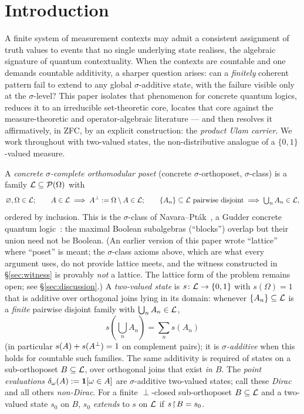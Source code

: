 \section{Introduction}

A finite system of measurement contexts may admit a consistent assignment of
truth values to events that no single underlying state realises, the
algebraic signature of quantum contextuality. When the contexts are countable
and one demands countable additivity, a sharper question arises: can a
\emph{finitely} coherent pattern fail to extend to any global $\sigma$-additive
state, with the failure visible only at the $\sigma$-level? This paper isolates
that phenomenon for concrete quantum logics, reduces it to an irreducible
set-theoretic core, locates that core against the measure-theoretic and
operator-algebraic literature --- and then resolves it affirmatively, in ZFC,
by an explicit construction: the \emph{product Ulam carrier}. We work throughout
with two-valued states, the non-distributive analogue of a $\{0,1\}$-valued measure.

A \emph{concrete $\sigma$-complete orthomodular poset} (concrete $\sigma$-orthoposet,
$\sigma$-class)
is a family $\mathcal{L} \subseteq \mathcal{P}(\Omega)$ with
\[
  \varnothing, \Omega \in \mathcal{L}; \qquad
  A \in \mathcal{L} \implies A{}^{\perp} := \Omega\setminus A \in \mathcal{L}; \qquad
  \{A_n\}\subseteq\mathcal{L} \text{ pairwise disjoint} \implies \textstyle\bigcup_n A_n \in \mathcal{L},
\]
ordered by inclusion. This is the $\sigma$-class of Navara--Pt\'ak~\cite{NavaraPtak1983},
a Gudder concrete quantum logic~\cite{Gudder1969,PtakPulmannova1991}: the maximal
Boolean subalgebras (``blocks'') overlap but their union need not be Boolean.
(An earlier version of this paper wrote ``lattice'' where ``poset'' is meant; the
$\sigma$-class axioms above, which are what every argument uses, do not provide
lattice meets, and the witness constructed in \S\ref{sec:witness} is provably
\emph{not} a lattice. The lattice form of the problem remains open;
see \S\ref{sec:discussion}.) A
\emph{two-valued state} is $s\colon\mathcal{L}\to\{0,1\}$ with $s(\Omega)=1$ that is
additive over orthogonal joins lying in its domain: whenever $\{A_n\}\subseteq\mathcal{L}$
is a \emph{finite} pairwise disjoint family with $\bigcup_n A_n\in\mathcal{L}$,
\[
  s\!\left(\textstyle\bigcup_n A_n\right)=\textstyle\sum_n s(A_n)
\]
(in particular $s(A)+s(A{}^{\perp})=1$ on complement pairs); it is \emph{$\sigma$-additive}
when this holds for countable such families. The same additivity is required of states
on a sub-orthoposet $B\subseteq\mathcal{L}$, over orthogonal joins that exist \emph{in $B$}.
The \emph{point evaluations} $\delta_\omega(A):=\mathbf{1}[\omega\in A]$ are
$\sigma$-additive two-valued states; call these \emph{Dirac} and all others
\emph{non-Dirac}. For a finite $\perp$-closed sub-orthoposet $B\subseteq\mathcal{L}$ and a
two-valued state $s_0$ on $B$, $s_0$ \emph{extends} to $s$ on $\mathcal{L}$ if $s\!\restriction\! B=s_0$.

